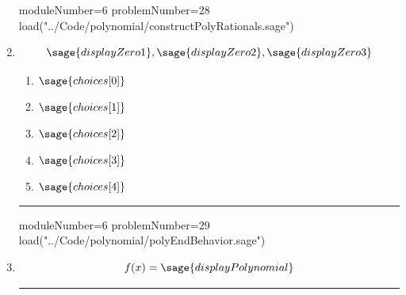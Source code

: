 \documentclass[14pt]{article}
\newcommand{\litem}[1]{\item#1\hspace*{-1cm}\rule{\textwidth}{0.4pt}}
\begin{document}
\begin{enumerate}
\begin{sagesilent}
moduleNumber=6
problemNumber=28
load("../Code/polynomial/constructPolyRationals.sage")
\end{sagesilent}

\litem{ 

	\[ \sage{displayZero1}, \sage{displayZero2}, \sage{displayZero3} \]

	\begin{enumerate}[label=\Alph*.]
		\item \( \sage{choices[0]} \)
		\item \( \sage{choices[1]} \)
		\item \( \sage{choices[2]} \)
		\item \( \sage{choices[3]} \)
		\item \( \sage{choices[4]} \)
	\end{enumerate}
}

\begin{sagesilent}
moduleNumber=6
problemNumber=29
load("../Code/polynomial/polyEndBehavior.sage")
\end{sagesilent}

\litem{ 

	\[ f(x) = \sage{displayPolynomial} \]

}
\end{enumerate}
\end{document}
